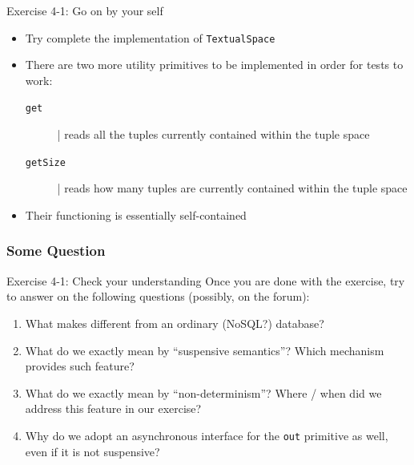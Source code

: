 \documentclass[presentation]{beamer}\mode<presentation>{\usetheme{AMSCesenaPurpleAndGold}}
\begin{document}
\begin{frame}{Exercise 4-1: Go on by your self}
\begin{itemize}
	\item Try complete the implementation of \texttt{TextualSpace}
	
	\vfill
	
	\item There are two more utility primitives to be implemented in order for tests to work:
	\begin{description}
		\item[\texttt{get}] | reads \alert{all} the tuples currently contained within the tuple space 
		\item[\texttt{getSize}] | reads \alert{how many} tuples are currently contained within the tuple space 
	\end{description}

	\vfill
	
	\item Their functioning is essentially self-contained
	
\end{itemize}
\end{frame}

\subsubsection{Some Question}

\begin{frame}{Exercise 4-1: Check your understanding}
Once you are done with the exercise, try to answer on the following questions (possibly, on the forum):
%
\vfill
%
\begin{enumerate}
	\item What makes \linda{} different from an ordinary (NoSQL?) database?
	
	\vfill
	
	\item What do we exactly mean by ``\alert{suspensive semantics}''? Which mechanism provides such feature?
	
	\vfill
	
	\item What do we exactly mean by ``\alert{non-determinism}''? Where / when did we address this feature in our exercise?
	
	\vfill
	
	\item Why do we adopt an asynchronous interface for the \texttt{\alert{out}} primitive as well, even if it is not suspensive?
	
\end{enumerate}
\end{frame}
\end{document}
